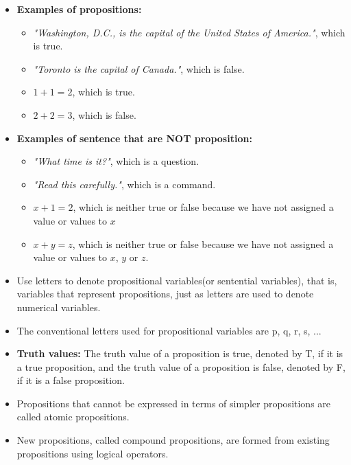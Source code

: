 \vspace{5pt}
\begin{center}
\noindent{}
\end{center}
\vspace{5pt}
\begin{itemize}
    \item \textbf{Examples of propositions:}
    \begin{itemize}
        \item \textit{"Washington, D.C., is the capital of the United States of America."}, which is true.
        \item \textit{"Toronto is the capital of Canada."}, which is false.
        \item $1+1=2$, which is true.
        \item $2+2=3$, which is false.
    \end{itemize}
    \item \textbf{Examples of sentence that are NOT proposition:}
    \begin{itemize}
        \item \textit{"What time is it?"}, which is a question.
        \item \textit{"Read this carefully."}, which is a command.
        \item $x+1=2$, which is neither true or false because we have not assigned a value or values to $x$
        \item $x+y=z$, which is neither true or false because we have not assigned a value or values to $x$, $y$ or $z$.
    \end{itemize}
    \item Use letters to denote propositional variables(or sentential variables), that is, variables
that represent propositions, just as letters are used to denote numerical variables.
    \item The conventional letters used for propositional variables are p, q, r, s, ...
    \item \textbf{Truth values:} The truth value of a proposition is true, denoted by T, if it is a true proposition, and the truth value of a proposition is false, denoted by F, if it is a false proposition. 
    \item Propositions that cannot be expressed in terms of simpler propositions are called atomic propositions.
    \item New propositions, called compound propositions, are formed from existing propositions using logical operators.
\end{itemize}